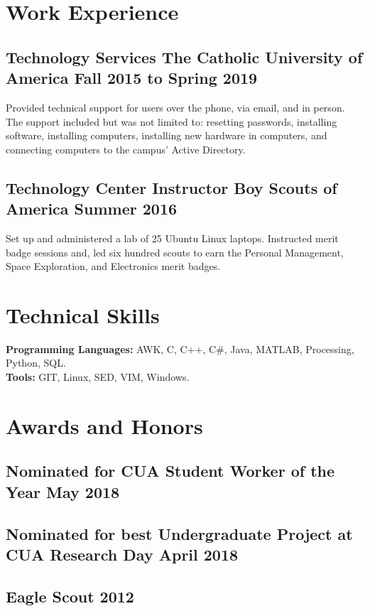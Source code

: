 \documentclass[12pt, letterpaper]{article}
\begin{document}
\section{Work Experience}
\subsection{Technology Services \hspace {60pt}The Catholic University of America \hfill Fall 2015 to Spring 2019}
\justify
Provided technical support for users over the phone, via email, and in person.
The support included but was not limited to:
resetting passwords,
installing software,
installing computers,
installing new hardware in computers,
and
connecting computers to the campus' Active Directory.
\subsection{Technology Center Instructor \hspace {45pt} Boy Scouts of America \hfill Summer 2016}
\justify
Set up and administered a lab of 25 Ubuntu Linux laptops.
Instructed merit badge sessions and, led six hundred scouts to earn the
Personal Management,
Space Exploration,
and
Electronics
merit badges.

\section{Technical Skills}
\textbf{Programming Languages:}
AWK,
C,
C++,
C\#,
Java,
MATLAB,
Processing,
Python,
SQL.\\
\textbf{Tools:}
GIT,
Linux,
SED,
VIM,
Windows.

\section{Awards and Honors}
\subsection{Nominated for CUA Student Worker of the Year \hfill May 2018}
\subsection{Nominated for best Undergraduate Project at CUA Research Day \hfill April 2018}
\subsection{Eagle Scout \hfill 2012}
\end{document}
